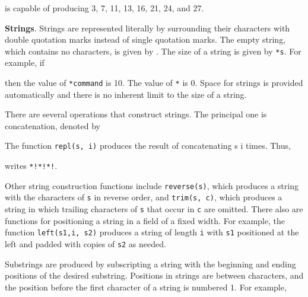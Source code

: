 


\noindent is capable of producing 3, 7, 11, 13, 16, 21, 24, and 27.


\textbf{Strings}. Strings are represented literally by surrounding
their characters with double quotation marks instead of single
quotation marks. The empty string, which contains no characters, is
given by \texttt{{\textquotedbl}{\textquotedbl}}. The size of a string
is given by \texttt{*s}. For example, if



\noindent then the value of \texttt{*command} is 10. The value of
\texttt{*{\textquotedbl}{\textquotedbl}} is 0. Space for strings is
provided automatically and there is no inherent limit to the size of a
string.

There are several operations that construct strings. The principal one
is concatenation, denoted by



The function \texttt{repl(s, i)} produces the result of concatenating
s i times. Thus,



\noindent writes \texttt{*!*!*!}.


Other string construction functions include \texttt{reverse(s)}, which
produces a string with the characters of \texttt{s} in reverse order,
and \texttt{trim(s, c)}, which produces a string in which trailing
characters of \texttt{s} that occur in \texttt{c} are omitted. There
also are functions for positioning a string in a field of a fixed
width. For example, the function \texttt{left(s1,i, s2)} produces a
string of length \texttt{i} with \texttt{s1} positioned at the left
and padded with copies of \texttt{s2} as needed.

Substrings are produced by subscripting a string with the beginning
and ending positions of the desired substring.  Positions in strings
are between characters, and the position before the first character of
a string is numbered 1. For example,

